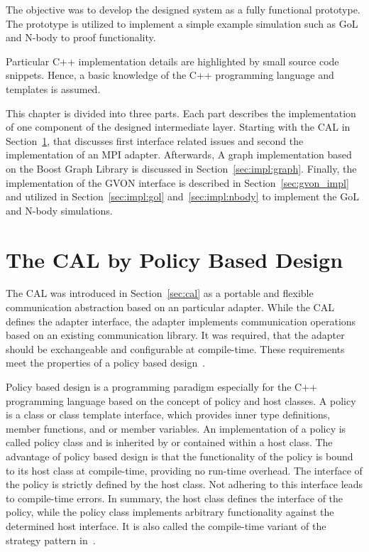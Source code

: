 The objective was to develop the designed system as a fully functional prototype.
The prototype is utilized to implement a simple example simulation such as GoL
and N-body to proof functionality. 

Particular C++ implementation details are highlighted by small source
code snippets. Hence, a basic knowledge of the C++ programming
language and templates is assumed.

This chapter is divided into three parts. Each part describes the
implementation of one component of the designed intermediate layer.
Starting with the CAL in Section~\ref{sec:impl:cal}, that discusses
first interface related issues and second the implementation
of an MPI adapter. Afterwards, A graph implementation based on the
Boost Graph Library is discussed in
Section~\ref{sec:impl:graph}. Finally, the implementation of the GVON
interface is described in Section~\ref{sec:gvon_impl} and utilized in
Section~\ref{sec:impl:gol} and~\ref{sec:impl:nbody} to implement the
GoL and N-body simulations.


\section{The CAL by Policy Based Design}
\label{sec:impl:cal}

The CAL was introduced in Section~\ref{sec:cal} as a portable and
flexible communication abstraction based on an particular
adapter. While the CAL defines the adapter interface, the adapter
implements communication operations based on an existing communication
library.  It was required, that the adapter should be exchangeable and
configurable at compile-time. These requirements meet the properties
of a policy based design~\cite{ref:policy_based_design}.

Policy based design is a programming paradigm especially for the C++
programming language based on the concept of policy and host classes.
A policy is a class or class template interface, which provides inner
type definitions, member functions, and or member variables. An
implementation of a policy is called policy class and is inherited by
or contained within a host class.  The advantage of policy based
design is that the functionality of the policy is bound to its host
class at compile-time, providing no run-time overhead.  The interface
of the policy is strictly defined by the host class. Not adhering to this
interface leads to compile-time errors. In summary, the host class
defines the interface of the policy, while the policy class implements
arbitrary functionality against the determined host interface. It is
also called the compile-time variant of the strategy pattern
in~\cite{ref:policy_strategy}.

